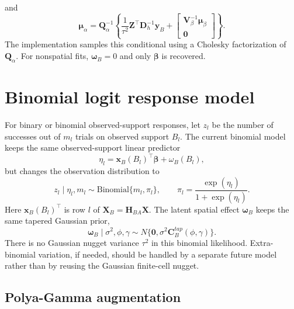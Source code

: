 \documentclass[11pt]{article}
\newcommand{\by}{\bm{y}}
\newcommand{\bbeta}{\bm{\beta}}
\newcommand{\bw}{\bm{\omega}}
\newcommand{\bzero}{\bm{0}}
\newcommand{\bC}{\bm{C}}
\newcommand{\bD}{\bm{D}}
\newcommand{\bH}{\bm{H}}
\newcommand{\bV}{\bm{V}}
\newcommand{\bQ}{\bm{Q}}
\newcommand{\bX}{\bm{X}}
\newcommand{\bZ}{\bm{Z}}
\newcommand{\trans}{^\top}
\begin{document}
and
\begin{equation}
  \bm{\mu}_\alpha =
  \bQ_\alpha^{-1}
  \left\{
    \frac{1}{\tau^2}\bZ\trans\bD_h^{-1}\by_B+
    \begin{bmatrix}
      \bV_\beta^{-1}\bm{\mu}_\beta\\
      \bzero
    \end{bmatrix}
  \right\}.
\end{equation}
The implementation samples this conditional using a Cholesky factorization of
\(\bQ_\alpha\). For nonspatial fits, \(\bw_B=0\) and only \(\bbeta\) is
recovered.

\section{Binomial logit response model}

For binary or binomial observed-support responses, let \(z_l\) be the number
of successes out of \(m_l\) trials on observed support \(B_l\). The current
binomial model keeps the same observed-support linear predictor
\begin{equation}
  \eta_l = \bm{x}_B(B_l)\trans\bbeta+\omega_B(B_l),
\end{equation}
but changes the observation distribution to
\begin{equation}
  z_l\mid \eta_l,m_l \sim \mathrm{Binomial}\{m_l,\pi_l\},
  \qquad
  \pi_l = \frac{\exp(\eta_l)}{1+\exp(\eta_l)}.
\end{equation}
Here \(\bm{x}_B(B_l)\trans\) is row \(l\) of \(\bX_B=\bH_{BA}\bX\). The
latent spatial effect \(\bw_B\) keeps the same tapered Gaussian prior,
\begin{equation}
  \bw_B\mid\sigma^2,\phi,\gamma
  \sim N\{\bzero,\sigma^2\bC_B^{tap}(\phi,\gamma)\}.
\end{equation}
There is no Gaussian nugget variance \(\tau^2\) in this binomial likelihood.
Extra-binomial variation, if needed, should be handled by a separate future
model rather than by reusing the Gaussian finite-cell nugget.

\subsection{Polya-Gamma augmentation}
\end{document}

